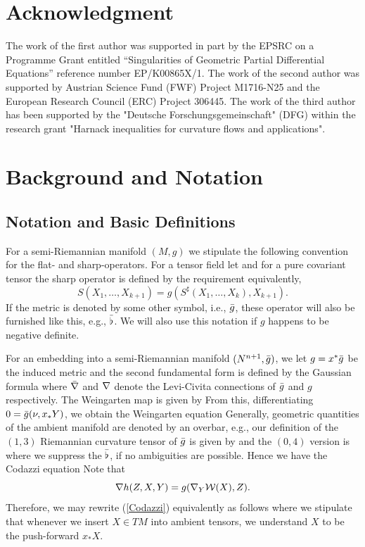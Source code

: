 \section*{Acknowledgment}
The work of the first author was supported  in part by the EPSRC on a Programme Grant entitled ``Singularities of Geometric Partial Differential Equations'' reference number EP/K00865X/1. The work of the second author was supported by Austrian Science Fund (FWF) Project
M1716-N25 and the European Research Council (ERC) Project 306445. The work of the third author has been supported by the "Deutsche Forschungsgemeinschaft" (DFG) within the research grant "Harnack inequalities for curvature flows and applications".
\section{Background and Notation}
\subsection{Notation and Basic Definitions}
\label{subsec:bg_notation}
For a semi-Riemannian manifold $(M,g)$ we stipulate the following convention for the flat- and sharp-operators. For a tensor field
let
 and for a pure covariant tensor the sharp operator is defined by the requirement
equivalently,
\[S(X_{1},\dots, X_{k+1})=g(S^{\sharp}(X_{1},\dots, X_{k}),X_{k+1}).\]
If the metric is denoted by some other symbol, i.e., $\-g$, these operator will also be furnished like this, e.g., $\-\flat$. We will also use this notation if $g$ happens to be negative definite.

For an embedding into a semi-Riemannian manifold $(N^{n+1},\-g)$,
we let $g=x^{*}\-g$ be the induced metric and the second fundamental form is defined by the Gaussian formula
where $\-\n$ and $\n$ denote the Levi-Civita connections of $\-g$ and $g$ respectively. The Weingarten map is given by
From this, differentiating $0=\-g(\nu,{x_{*}Y})$, we obtain the Weingarten equation
Generally, geometric quantities of the ambient manifold are denoted by an overbar, e.g., our definition of the $(1,3)$ Riemannian curvature tensor of $\-g$ is given by
and the $(0,4)$ version is
where we suppress the $\-\flat$, if no ambiguities are possible.
Hence we have the Codazzi equation
Note that
\[\nabla h (Z,X,Y)=g(\nabla_Y \mc{W}(X),Z).\]
Therefore, we may rewrite (\ref{Codazzi}) equivalently as follows
where we stipulate that whenever we insert $X\in  T M$ into ambient tensors, we understand $X$ to be the push-forward $x_{*}X.$

